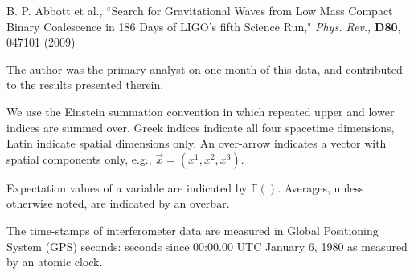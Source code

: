 \documentclass[12pt,notitlepage]{report}
\begin{document}
\vspace*{0.25cm}
\noindent B. P. Abbott et al., ``Search for Gravitational Waves from Low Mass Compact Binary Coalescence in 186 Days of LIGO's fifth Science Run," {\it Phys. Rev.,} {\bf D80}, 047101 (2009)

\vspace*{0.25cm}
\noindent The author was the primary analyst on one month of this data, and contributed to the results presented therein.




We use the Einstein summation convention in which repeated upper and lower
indices are summed over. Greek indices indicate all four spacetime dimensions,
Latin indicate spatial dimensions only. An over-arrow indicates a vector with
spatial components only, e.g., $\vec{x} = (x^1,x^2,x^3)$.

\vspace{0.5cm}

\noindent Expectation values of a variable are indicated by $\mathbb{E}()$.
Averages, unless otherwise noted, are indicated by an overbar.

\vspace{0.5cm}

\noindent The time-stamps of interferometer data are measured in
Global Positioning System (GPS) seconds: seconds since 00:00.00 UTC
January 6, 1980 as measured by an atomic clock.

\afterpreface

\label{ch:introduction}


\label{ch:theory}


\label{ch:pipeline_principles}


\label{ch:far}


\label{ch:ihope_pipeline}


\label{ch:s5_results}


\label{ch:s6_results}


\label{ch:ligo_south_study}


\label{ch:future_developments}


\clearpage


\clearpage
\end{document}
